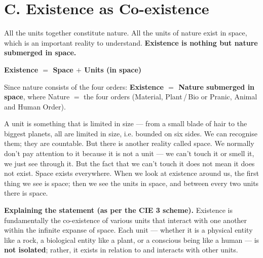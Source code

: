 \section{C. Existence as Co-existence}


\ans All the units together constitute nature. All the units of nature exist
in space, which is an important reality to understand. \textbf{Existence is
nothing but nature submerged in space.}

\begin{keybox}
\textbf{Existence $=$ Space $+$ Units (in space)}

\vspace{2pt}
Since nature consists of the four orders: \textbf{Existence $=$ Nature
submerged in space}, where Nature $=$ the four orders (Material,
Plant\,/\,Bio or Pranic, Animal and Human Order).
\end{keybox}

A unit is something that is limited in size --- from a small blade of hair to
the biggest planets, all are limited in size, i.e. bounded on six sides. We
can recognise them; they are countable. But there is another reality called
space. We normally don't pay attention to it because it is not a unit --- we
can't touch it or smell it, we just see through it. But the fact that we can't
touch it does not mean it does not exist. Space exists everywhere. When we
look at existence around us, the first thing we see is space; then we see the
units in space, and between every two units there is space.

\textbf{Explaining the statement (as per the CIE 3 scheme).} Existence is
fundamentally the co-existence of various units that interact with one another
within the infinite expanse of space. Each unit --- whether it is a physical
entity like a rock, a biological entity like a plant, or a conscious being
like a human --- is \textbf{not isolated}; rather, it exists in relation to
and interacts with other units.

